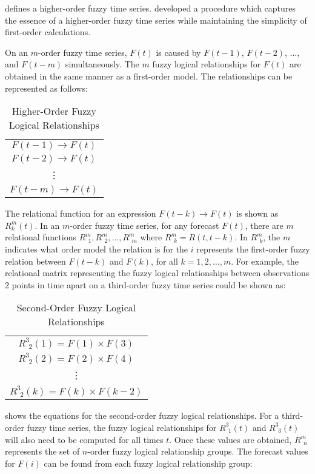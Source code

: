 \documentclass{article}
\theoremstyle{definition}
\begin{document}
 defines a higher-order fuzzy time series. \cite{tsai1999study} developed a procedure which captures the essence of a higher-order fuzzy time series while maintaining the simplicity of first-order calculations.

On an $m$-order fuzzy time series, $F(t)$ is caused by $F(t-1)$, $F(t-2)$, $\ldots$, and $F(t-m)$ simultaneously. The $m$ fuzzy logical relationships for $F(t)$ are obtained in the same manner as a first-order model. The relationships can be represented as follows:

\begin{table}[H]
	\center
	\begin{tabular}{ c }
  	$F(t-1) \rightarrow F(t)$ \\
  	$F(t-2) \rightarrow F(t)$ \\
  	\vdots \\
  	$F(t-m) \rightarrow F(t)$ \\
	\end{tabular}
	\caption{Higher-Order Fuzzy Logical Relationships}
\end{table}

The relational function for an expression $F(t-k) \rightarrow F(t)$ is shown as $R^{m}_{k}(t)$. In an $m$-order fuzzy time series, for any forecast $F(t)$, there are $m$ relational functions $R^{m}_{\ \ 1}, R^{m}_{\ \ 2}, \ldots, R^{m}_{\ \ m}$ where $R^{m}_{\ \ k}=R(t,t-k)$. In $R^{m}_{\ \ k}$, the $m$ indicates what order model the relation is for the $i$ represents the first-order fuzzy relation between $F(t-k)$ and $F(k)$, for all $k={1,2,\ldots,m}$. For example, the relational matrix representing the fuzzy logical relationships between observations 2 points in time apart on a third-order fuzzy time series could be shown as:

\begin{table}[H]
	\center
	\begin{tabular}{ c }
  	$R^{3}_{\ \ 2}(1) = F(1) \times F(3)$ \\
  	$R^{3}_{\ \ 2}(2) = F(2) \times F(4)$ \\
  	\vdots \\
  	$R^{3}_{\ \ 2}(k) = F(k) \times F(k-2)$ \\
	\end{tabular}
	\caption{Second-Order Fuzzy Logical Relationships}
	\label{second-order-rels}
\end{table}

 shows the equations for the second-order fuzzy logical relationships. For a third-order fuzzy time series, the fuzzy logical relationships for $R^{3}_{\ \ 1}(t)$ and $R^{3}_{\ \ 3}(t)$ will also need to be computed for all times $t$. Once these values are obtained, $R^{m}_{\ \ n}$ represents the set of $n$-order fuzzy logical relationship groups. The forecast values for $F(i)$ can be found from each fuzzy logical relationship group:
\end{document}
